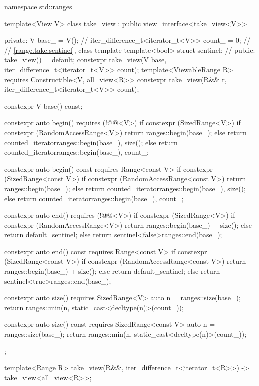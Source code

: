 \begin{codeblock}
namespace std::ranges {
  template<View V>
  class take_view : public view_interface<take_view<V>> {
  private:
    V base_ = V();                                      // \expos
    iter_difference_t<iterator_t<V>> count_ = 0;        // \expos
    // \ref{range.take.sentinel}, class template 
    template<bool> struct sentinel;                     // \expos
  public:
    take_view() = default;
    constexpr take_view(V base, iter_difference_t<iterator_t<V>> count);
    template<ViewableRange R>
      requires Constructible<V, all_view<R>>
    constexpr take_view(R&& r, iter_difference_t<iterator_t<V>> count);

    constexpr V base() const;

    constexpr auto begin() requires (!@@<V>) {
      if constexpr (SizedRange<V>) {
        if constexpr (RandomAccessRange<V>)
          return ranges::begin(base_);
        else
          return counted_iterator{ranges::begin(base_), size()};
      } else
        return counted_iterator{ranges::begin(base_), count_};
    }

    constexpr auto begin() const requires Range<const V> {
      if constexpr (SizedRange<const V>) {
        if constexpr (RandomAccessRange<const V>)
          return ranges::begin(base_);
        else
          return counted_iterator{ranges::begin(base_), size()};
      } else
        return counted_iterator{ranges::begin(base_), count_};
    }

    constexpr auto end() requires (!@@<V>) {
      if constexpr (SizedRange<V>) {
        if constexpr (RandomAccessRange<V>)
          return ranges::begin(base_) + size();
        else
          return default_sentinel;
      } else
        return sentinel<false>{ranges::end(base_)};
    }

    constexpr auto end() const requires Range<const V> {
      if constexpr (SizedRange<const V>) {
        if constexpr (RandomAccessRange<const V>)
          return ranges::begin(base_) + size();
        else
          return default_sentinel;
      } else
        return sentinel<true>{ranges::end(base_)};
    }

    constexpr auto size() requires SizedRange<V> {
      auto n = ranges::size(base_);
      return ranges::min(n, static_cast<decltype(n)>(count_));
    }

    constexpr auto size() const requires SizedRange<const V> {
      auto n = ranges::size(base_);
      return ranges::min(n, static_cast<decltype(n)>(count_));
    }
  };

  template<Range R>
    take_view(R&&, iter_difference_t<iterator_t<R>>)
      -> take_view<all_view<R>>;
}
\end{codeblock}

